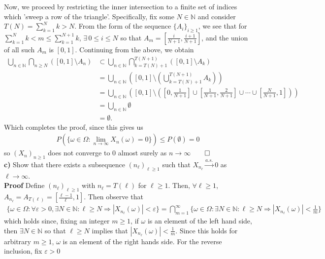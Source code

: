 \documentclass[10pt]{article}
\newcommand{\bp}[1]{\left({#1}\right)}
\newcommand{\mbb}[1]{\mathbb{#1}}
\newcommand{\1}[1]{\mathbbm{1}_{#1}}
\begin{document}
    Now, we proceed by restricting the inner intersection to a finite set of indices which 'sweep a row of the triangle'. Specifically, fix some $N\in\mbb{N}$ and consider $T(N)=\sum_{k=1}^Nk>N$. From the form of the sequence $\{A_i\}_{i\geq 1}$, we see that
    for $\sum_{k=1}^Nk<m\leq\sum_{k=1}^{N+1}k$, $\exists\, 0\leq i\leq N$ so that $A_m=[\tfrac{i}{N+1},\tfrac{i+1}{N+1}]$, and the union of all such $A_m$ is $[0,1]$. Continuing from the above, we obtain
    \begin{align*}
        \bigcup_{n\in\mbb{N}}\bigcap_{n\geq N}([0,1]\setminus A_n)&\subset\bigcup_{n\in\mbb{N}}\bigcap_{k=T(N)+1}^{T(N+1)}([0,1]\setminus A_k)\tag{$N<T(N)+1\leq T(N+1)$}\\
        &=\bigcup_{n\in\mbb{N}}\bp{[0,1]\setminus\bp{\bigcup_{k=T(N)+1}^{T(N+1)}A_k}}\tag{DeMorgan's Law}\\
        &=\bigcup_{n\in\mbb{N}}\bp{[0,1]\setminus\bp{[0,\tfrac{1}{N+1}]\cup[\tfrac{1}{N+1},\tfrac{2}{N+1}]\cup\cdots\cup[\tfrac{N}{N+1},1]}}\\
        &=\bigcup_{n\in\mbb{N}}\emptyset\\
        &=\emptyset.
    \end{align*}
    Which completes the proof, since this gives us
    \begin{align*}
        P(\{\omega\in\Omega:\lim_{n\rightarrow\infty}X_n(\omega)=0\})\leq P(\emptyset)=0
    \end{align*}
    so $(X_n)_{n\geq 1}$ does not converge to $0$ almost surely as $n\rightarrow\infty$\hfill{$\qed$}\\[5pt]
    {\bf c)} Show that there exists a subsequence $(n_\ell)_{\ell\geq 1}$ such that $X_{n_\ell}\overset{a.s.}{\longrightarrow}0$ as $\ell\rightarrow\infty$.\\[5pt]
    {\bf Proof}\hspace{5pt} Define $(n_\ell)_{\ell\geq 1}$ with $n_\ell=T(\ell)$ for $\ell\geq 1$. Then, $\forall\ell\geq 1$, $A_{n_\ell}=A_{T(\ell)}=[\tfrac{\ell-1}{\ell},1]$. Then observe that
    \begin{align*}
        \{\omega\in\Omega:\forall\varepsilon>0,\exists N\in\mbb{N}:\ell\geq N\Rightarrow|X_{n_\ell}(\omega)|<\varepsilon\}=\bigcap_{m=1}^\infty\{\omega\in\Omega:\exists N\in\mbb{N}:\ell\geq N\Rightarrow|X_{n_\ell}(\omega)|<\tfrac{1}{m}\}\tag{14}
    \end{align*}
    which holds since, fixing an integer $m\geq 1$, if $\omega$ is an element of the left hand side, then $\exists N\in\mbb{N}$ so that $\ell\geq N$ implies that $|X_{n_\ell}(\omega)|<\tfrac{1}{m}$. Since this holds for arbitrary $m\geq 1$, $\omega$ is an element of the right hands side. For the reverse inclusion, fix $\varepsilon>0$
\end{document}
